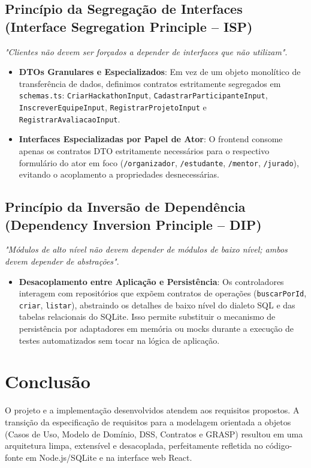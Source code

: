 \documentclass[12pt]{article}
\begin{document}
\subsection{Princípio da Segregação de Interfaces (Interface Segregation Principle -- ISP)}
\textit{"Clientes não devem ser forçados a depender de interfaces que não utilizam"}.
\begin{itemize}
    \item \textbf{DTOs Granulares e Especializados}: Em vez de um objeto monolítico de transferência de dados, definimos contratos estritamente segregados em \texttt{schemas.ts}: \texttt{CriarHackathonInput}, \texttt{CadastrarParticipanteInput}, \texttt{InscreverEquipeInput}, \texttt{RegistrarProjetoInput} e \texttt{RegistrarAvaliacaoInput}.
    \item \textbf{Interfaces Especializadas por Papel de Ator}: O frontend consome apenas os contratos DTO estritamente necessários para o respectivo formulário do ator em foco (\texttt{/organizador}, \texttt{/estudante}, \texttt{/mentor}, \texttt{/jurado}), evitando o acoplamento a propriedades desnecessárias.
\end{itemize}

\subsection{Princípio da Inversão de Dependência (Dependency Inversion Principle -- DIP)}
\textit{"Módulos de alto nível não devem depender de módulos de baixo nível; ambos devem depender de abstrações"}.
\begin{itemize}
    \item \textbf{Desacoplamento entre Aplicação e Persistência}: Os controladores interagem com repositórios que expõem contratos de operações (\texttt{buscarPorId}, \texttt{criar}, \texttt{listar}), abstraindo os detalhes de baixo nível do dialeto SQL e das tabelas relacionais do SQLite. Isso permite substituir o mecanismo de persistência por adaptadores em memória ou mocks durante a execução de testes automatizados sem tocar na lógica de aplicação.
\end{itemize}

\section{Conclusão}

O projeto e a implementação desenvolvidos atendem aos requisitos propostos. A transição da especificação de requisitos para a modelagem orientada a objetos (Casos de Uso, Modelo de Domínio, DSS, Contratos e GRASP) resultou em uma arquitetura limpa, extensível e desacoplada, perfeitamente refletida no código-fonte em Node.js/SQLite e na interface web React.



\end{document}
